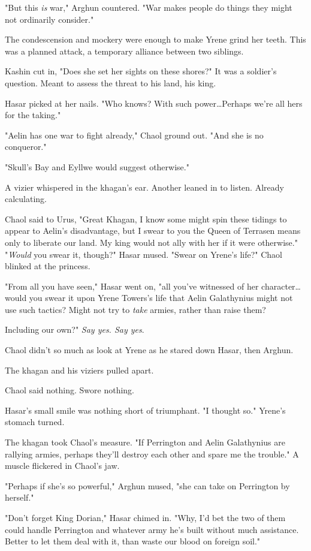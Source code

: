 "But this \emph{is} war," Arghun countered.
"War makes people do things they might not ordinarily consider."

The condescension and mockery were enough to make Yrene grind her teeth.
This was a planned attack, a temporary alliance between two siblings.

Kashin cut in, "Does she set her sights on these shores?"
It was a soldier's question.
Meant to assess the threat to his land, his king.

Hasar picked at her nails.
"Who knows?
With such power\ldots Perhaps we're all hers for the taking."

"Aelin has one war to fight already," Chaol ground out.
"And she is no conqueror."

"Skull's Bay and Eyllwe would suggest otherwise."

A vizier whispered in the khagan's ear.
Another leaned in to listen.
Already calculating.

Chaol said to Urus, "Great Khagan, I know some might spin these tidings to appear to Aelin's disadvantage, but I swear to you the Queen of Terrasen means only to liberate our land.
My king would not ally with her if it were otherwise."
"\emph{Would} you swear it, though?"
Hasar mused.
"Swear on Yrene's life?"
Chaol blinked at the princess.

"From all you have seen," Hasar went on, "all you've witnessed of her character\ldots would you swear it upon Yrene Towers's life that Aelin Galathynius might not use such tactics?
Might not try to \emph{take} armies, rather than raise them?

Including our own?"
\emph{Say yes.
Say yes}.

Chaol didn't so much as look at Yrene as he stared down Hasar, then Arghun.

The khagan and his viziers pulled apart.

Chaol said nothing.
Swore nothing.

Hasar's small smile was nothing short of triumphant.
"I thought so."
Yrene's stomach turned.

The khagan took Chaol's measure.
"If Perrington and Aelin Galathynius are rallying armies, perhaps they'll destroy each other and spare me the trouble."
A muscle flickered in Chaol's jaw.

"Perhaps if she's so powerful," Arghun mused, "she can take on Perrington by herself."

"Don't forget King Dorian," Hasar chimed in.
"Why, I'd bet the two of them could handle Perrington and whatever army he's built without much assistance.
Better to let them deal with it, than waste our blood on foreign soil."

